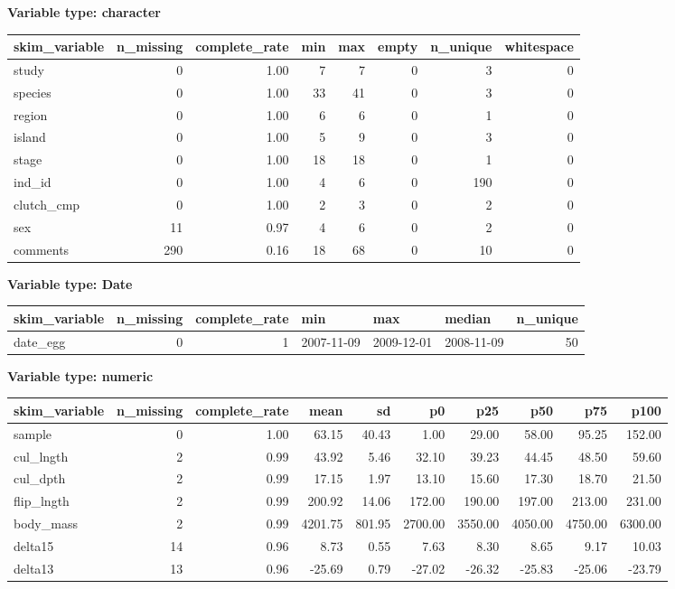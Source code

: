 \documentclass[letterpaper,9pt,twoside,]{pinp}
\begin{document}
\textbf{Variable type: character}

\begin{longtable}[]{@{}lrrrrrrr@{}}
\toprule
skim\_variable & n\_missing & complete\_rate & min & max & empty &
n\_unique & whitespace \\
\midrule
\endhead
study & 0 & 1.00 & 7 & 7 & 0 & 3 & 0 \\
species & 0 & 1.00 & 33 & 41 & 0 & 3 & 0 \\
region & 0 & 1.00 & 6 & 6 & 0 & 1 & 0 \\
island & 0 & 1.00 & 5 & 9 & 0 & 3 & 0 \\
stage & 0 & 1.00 & 18 & 18 & 0 & 1 & 0 \\
ind\_id & 0 & 1.00 & 4 & 6 & 0 & 190 & 0 \\
clutch\_cmp & 0 & 1.00 & 2 & 3 & 0 & 2 & 0 \\
sex & 11 & 0.97 & 4 & 6 & 0 & 2 & 0 \\
comments & 290 & 0.16 & 18 & 68 & 0 & 10 & 0 \\
\bottomrule
\end{longtable}

\textbf{Variable type: Date}

\begin{longtable}[]{@{}lrrlllr@{}}
\toprule
skim\_variable & n\_missing & complete\_rate & min & max & median &
n\_unique \\
\midrule
\endhead
date\_egg & 0 & 1 & 2007-11-09 & 2009-12-01 & 2008-11-09 & 50 \\
\bottomrule
\end{longtable}

\textbf{Variable type: numeric}

\begin{longtable}[]{@{}lrrrrrrrrr@{}}
\toprule
skim\_variable & n\_missing & complete\_rate & mean & sd & p0 & p25 &
p50 & p75 & p100 \\
\midrule
\endhead
sample & 0 & 1.00 & 63.15 & 40.43 & 1.00 & 29.00 & 58.00 & 95.25 &
152.00 \\
cul\_lngth & 2 & 0.99 & 43.92 & 5.46 & 32.10 & 39.23 & 44.45 & 48.50 &
59.60 \\
cul\_dpth & 2 & 0.99 & 17.15 & 1.97 & 13.10 & 15.60 & 17.30 & 18.70 &
21.50 \\
flip\_lngth & 2 & 0.99 & 200.92 & 14.06 & 172.00 & 190.00 & 197.00 &
213.00 & 231.00 \\
body\_mass & 2 & 0.99 & 4201.75 & 801.95 & 2700.00 & 3550.00 & 4050.00 &
4750.00 & 6300.00 \\
delta15 & 14 & 0.96 & 8.73 & 0.55 & 7.63 & 8.30 & 8.65 & 9.17 & 10.03 \\
delta13 & 13 & 0.96 & -25.69 & 0.79 & -27.02 & -26.32 & -25.83 & -25.06
& -23.79 \\
\bottomrule
\end{longtable}
\end{document}
